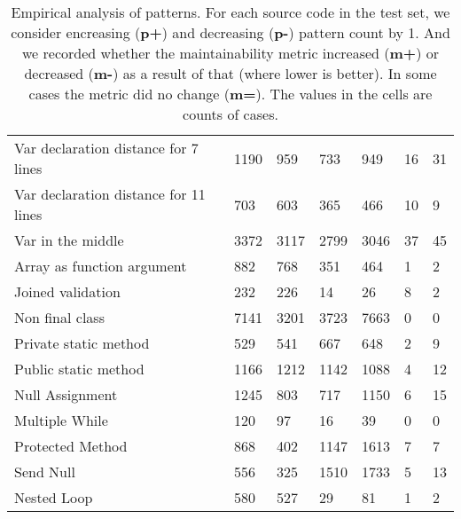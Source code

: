 \begin{table}[ht]
\begin{tabular}{lllllll}
Var declaration distance for 7 lines   		&	1190	&	959	&	733	&	949	&	16	&	31	\\
Var declaration distance for 11 lines  		&	703	&	603	&	365	&	466	&	10	&	9	\\
Var in the middle                      		&	3372	&	3117	&	2799	&	3046	&	37	&	45	\\
Array as function argument             		&	882	&	768	&	351	&	464	&	1	&	2	\\
Joined validation                      		&	232	&	226	&	14	&	26	&	8	&	2	\\
Non final class                        		&	7141	&	3201	&	3723	&	7663	&	0	&	0	\\
Private static method                  		&	529	&	541	&	667	&	648	&	2	&	9	\\
Public static method                   		&	1166	&	1212	&	1142	&	1088	&	4	&	12	\\
Null Assignment                        		&	1245	&	803	&	717	&	1150	&	6	&	15	\\
Multiple While                         		&	120	&	97	&	16	&	39	&	0	&	0	\\
Protected Method                       		&	868	&	402	&	1147	&	1613	&	7	&	7	\\
Send Null                              		&	556	&	325	&	1510	&	1733	&	5	&	13	\\
Nested Loop                            		&	580	&	527	&	29	&	81	&	1	&	2	\\
\hline
\end{tabular}
\centering
\caption{Empirical analysis of patterns. For each source code in the test set, we consider encreasing (\textbf{p+}) and decreasing (\textbf{p-}) pattern count by 1. And we recorded whether the maintainability metric increased (\textbf{m+}) or decreased (\textbf{m-}) as a result of that (where lower is better). In some cases the metric did no change (\textbf{m=}). The values in the cells are counts of cases.}
\label{tab:pattern_analysis}
\captionsetup{font=scriptsize}

\end{table}
